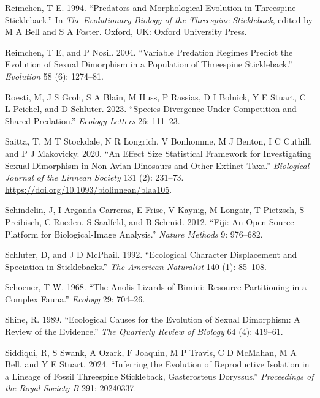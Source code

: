 \documentclass[
  12pt,
]{article}
\newlength{\cslhangindent}
\newlength{\cslentryspacingunit} %
\newenvironment{CSLReferences}[2] %
 {%
  \setlength{\parindent}{0pt}
  \ifodd #1
  \let\oldpar\par
  \def\par{\hangindent=\cslhangindent\oldpar}
  \fi
  \setlength{\parskip}{#2\cslentryspacingunit}
 }%
 {}
\begin{document}
\begin{CSLReferences}{1}{0}
\leavevmode{}%
Reimchen, T E. 1994. {``Predators and Morphological Evolution in
Threespine Stickleback.''} In \emph{The Evolutionary Biology of the
Threespine Stickleback}, edited by M A Bell and S A Foster. Oxford, UK:
Oxford University Press.

\leavevmode{}%
Reimchen, T E, and P Nosil. 2004. {``Variable Predation Regimes Predict
the Evolution of Sexual Dimorphism in a Population of Threespine
Stickleback.''} \emph{Evolution} 58 (6): 1274--81.

\leavevmode{}%
Roesti, M, J S Groh, S A Blain, M Huss, P Rassias, D I Bolnick, Y E
Stuart, C L Peichel, and D Schluter. 2023. {``Species Divergence Under
Competition and Shared Predation.''} \emph{Ecology Letters} 26: 111--23.

\leavevmode{}%
Saitta, T, M T Stockdale, N R Longrich, V Bonhomme, M J Benton, I C
Cuthill, and P J Makovicky. 2020. {``An Effect Size Statistical
Framework for Investigating Sexual Dimorphism in Non-Avian Dinosaurs and
Other Extinct Taxa.''} \emph{Biological Journal of the Linnean Society}
131 (2): 231--73. \url{https://doi.org/10.1093/biolinnean/blaa105}.

\leavevmode{}%
Schindelin, J, I Arganda-Carreras, E Frise, V Kaynig, M Longair, T
Pietzsch, S Preibisch, C Rueden, S Saalfeld, and B Schmid. 2012.
{``Fiji: An Open-Source Platform for Biological-Image Analysis.''}
\emph{Nature Methods} 9: 976--682.

\leavevmode{}%
Schluter, D, and J D McPhail. 1992. {``Ecological Character Displacement
and Speciation in Sticklebacks.''} \emph{The American Naturalist} 140
(1): 85--108.

\leavevmode{}%
Schoener, T W. 1968. {``The Anolis Lizards of Bimini: Resource
Partitioning in a Complex Fauna.''} \emph{Ecology} 29: 704--26.

\leavevmode{}%
Shine, R. 1989. {``Ecological Causes for the Evolution of Sexual
Dimorphism: A Review of the Evidence.''} \emph{The Quarterly Review of
Biology} 64 (4): 419--61.

\leavevmode{}%
Siddiqui, R, S Swank, A Ozark, F Joaquin, M P Travis, C D McMahan, M A
Bell, and Y E Stuart. 2024. {``Inferring the Evolution of Reproductive
Isolation in a Lineage of Fossil Threespine Stickleback, Gasterosteus
Doryssus.''} \emph{Proceedings of the Royal Society B} 291: 20240337.


\end{CSLReferences}
\end{document}
